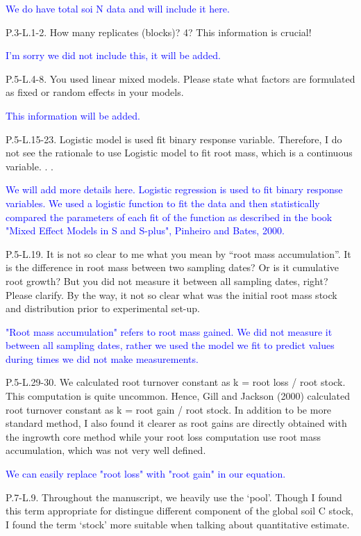 \documentclass[]{article}
\begin{document}
\textcolor{blue}{We do have total soi N data and will include it here.}

P.3-L.1-2. How many replicates (blocks)? 4? This information is crucial!

\textcolor{blue}{I'm sorry we did not include this, it will be added.}

P.5-L.4-8. You used linear mixed models. Please state what factors are
formulated as fixed or random effects in your models.

\textcolor{blue}{This information will be added.}

P.5-L.15-23. Logistic model is used fit binary response variable.
Therefore, I do not see the rationale to use Logistic model to fit root
mass, which is a continuous variable. . .

\textcolor{blue}{We will add more details here. Logistic regression is used to fit binary response variables. We used a logistic function to fit the data and then statistically compared the parameters of each fit of the function as described in the book "Mixed Effect Models in S and S-plus", Pinheiro and Bates, 2000.}

P.5-L.19. It is not so clear to me what you mean by ``root mass
accumulation''. It is the difference in root mass between two sampling
dates? Or is it cumulative root growth? But you did not measure it
between all sampling dates, right? Please clarify. By the way, it not so
clear what was the initial root mass stock and distribution prior to
experimental set-up.

\textcolor{blue}{"Root mass accumulation" refers to root mass gained. We did not measure it between all sampling dates, rather we used the model we fit to predict values during times we did not make measurements.}

P.5-L.29-30. We calculated root turnover constant as k = root loss /
root stock. This computation is quite uncommon. Hence, Gill and Jackson
(2000) calculated root turnover constant as k = root gain / root stock.
In addition to be more standard method, I also found it clearer as root
gains are directly obtained with the ingrowth core method while your
root loss computation use root mass accumulation, which was not very
well defined.

\textcolor{blue}{We can easily replace "root loss" with "root gain" in our equation.}

P.7-L.9. Throughout the manuscript, we heavily use the `pool'. Though I
found this term appropriate for distingue different component of the
global soil C stock, I found the term `stock' more suitable when talking
about quantitative estimate.
\end{document}
